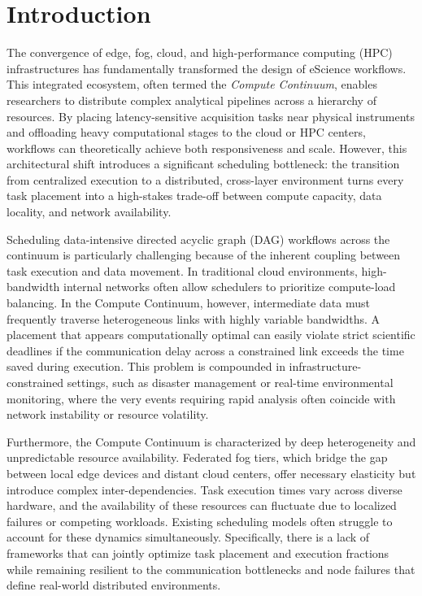 \section{Introduction}

The convergence of edge, fog, cloud, and high-performance computing (HPC) infrastructures has fundamentally transformed the design of eScience workflows. This integrated ecosystem, often termed the \emph{Compute Continuum}, enables researchers to distribute complex analytical pipelines across a hierarchy of resources. By placing latency-sensitive acquisition tasks near physical instruments and offloading heavy computational stages to the cloud or HPC centers, workflows can theoretically achieve both responsiveness and scale. However, this architectural shift introduces a significant scheduling bottleneck: the transition from centralized execution to a distributed, cross-layer environment turns every task placement into a high-stakes trade-off between compute capacity, data locality, and network availability.

Scheduling data-intensive directed acyclic graph (DAG) workflows across the continuum is particularly challenging because of the inherent coupling between task execution and data movement. In traditional cloud environments, high-bandwidth internal networks often allow schedulers to prioritize compute-load balancing. In the Compute Continuum, however, intermediate data must frequently traverse heterogeneous links with highly variable bandwidths. A placement that appears computationally optimal can easily violate strict scientific deadlines if the communication delay across a constrained link exceeds the time saved during execution. This problem is compounded in infrastructure-constrained settings, such as disaster management or real-time environmental monitoring, where the very events requiring rapid analysis often coincide with network instability or resource volatility.

Furthermore, the Compute Continuum is characterized by deep heterogeneity and unpredictable resource availability. Federated fog tiers, which bridge the gap between local edge devices and distant cloud centers, offer necessary elasticity but introduce complex inter-dependencies. Task execution times vary across diverse hardware, and the availability of these resources can fluctuate due to localized failures or competing workloads. Existing scheduling models often struggle to account for these dynamics simultaneously. Specifically, there is a lack of frameworks that can jointly optimize task placement and execution fractions while remaining resilient to the communication bottlenecks and node failures that define real-world distributed environments.

